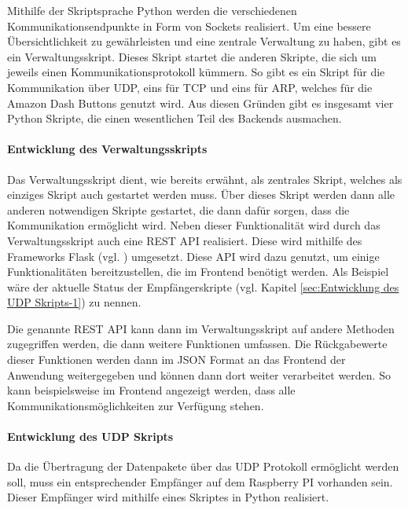 Mithilfe der Skriptsprache Python werden die verschiedenen Kommunikationsendpunkte in Form von Sockets realisiert. Um eine bessere Übersichtlichkeit zu gewährleisten und eine zentrale Verwaltung zu haben, gibt es ein Verwaltungsskript. Dieses Skript startet die anderen Skripte, die sich um jeweils einen Kommunikationsprotokoll kümmern. So gibt es ein Skript für die Kommunikation über \ac{UDP}, eins für \ac{TCP} und eins für \ac{ARP}, welches für die Amazon Dash Buttons genutzt wird. Aus diesen Gründen gibt es insgesamt vier Python Skripte, die einen wesentlichen Teil des Backends ausmachen.

\paragraph{Entwicklung des Verwaltungsskripts}$\;$ \\  
\label{sec:Entwicklung des Verwaltungsskripts-1} 
Das Verwaltungsskript dient, wie bereits erwähnt, als zentrales Skript, welches als einziges Skript auch gestartet werden muss. Über dieses Skript werden dann alle anderen notwendigen Skripte gestartet, die dann dafür sorgen, dass die Kommunikation ermöglicht wird. 
Neben dieser Funktionalität wird durch das Verwaltungsskript auch eine \ac{REST} \ac{API} realisiert. Diese wird mithilfe des Frameworks Flask (vgl. \cite{.s}) umgesetzt. Diese \ac{API} wird dazu genutzt, um einige Funktionalitäten bereitzustellen, die im Frontend benötigt werden. Als Beispiel wäre der aktuelle Status der Empfängerskripte (vgl. Kapitel \ref{sec:Entwicklung des UDP Skripts-1}) zu nennen. 

Die genannte \ac{REST} \ac{API} kann dann im Verwaltungsskript auf andere Methoden zugegriffen werden, die dann weitere Funktionen umfassen. Die Rückgabewerte dieser Funktionen werden dann im \ac{JSON} Format an das Frontend der Anwendung weitergegeben und können dann dort weiter verarbeitet werden. So kann beispielsweise im Frontend angezeigt werden, dass alle Kommunikationsmöglichkeiten zur Verfügung stehen. 

\paragraph{Entwicklung des UDP Skripts}$\;$ \\  
\label{sec:Entwicklung des UDP Skripts-1} 
Da die Übertragung der Datenpakete über das \ac{UDP} Protokoll ermöglicht werden soll, muss ein entsprechender Empfänger auf dem Raspberry PI vorhanden sein. Dieser Empfänger wird mithilfe eines Skriptes in Python realisiert.

